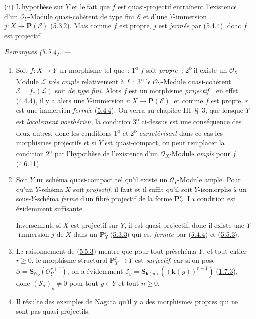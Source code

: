 (ii) L'hypothèse sur $Y$ et le fait que $f$ est quasi-projectif entraînent
l'existence d'un $\mathcal{O}_Y$-Module quasi-cohérent de type fini
$\mathcal{E}$ et d'une $Y$-immersion $j:X\to\mathbf{P}(\mathcal{E})$
(\hyperref[II.5.3.2-fr]{5.3.2}). Mais comme $f$ est propre, $j$ est \emph{fermée} par
(\hyperref[II.5.4.4-fr]{5.4.4}), donc $f$ est projectif.

\par\medskip\noindent\textit{Remarques (5.5.4). ---\ }
\label{II.5.5.4-fr}
\begin{enumerate}
  \item[\rm{(i)}] Soit $f:X\to Y$ un morphisme tel que~:
  1\textsuperscript{o} $f$ soit \emph{propre}~; 2\textsuperscript{o} il existe un
  $\mathcal{O}_X$-Module $\mathcal{L}$ \emph{très ample} relativement à $f$~;
  3\textsuperscript{o} le $\mathcal{O}_Y$-Module quasi-cohérent
  $\mathcal{E}=f_*(\mathcal{L})$ soit \emph{de type fini}. Alors $f$ est un morphisme
  \emph{projectif}~: en effet (\hyperref[II.4.4.4-fr]{4.4.4}), il y a alors une
  $Y$-immersion $r:X\to\mathbf{P}(\mathcal{E})$, et comme $f$ est propre, $r$
  est une immersion \emph{fermée} (\hyperref[II.5.4.4-fr]{5.4.4}). On verra au
  chapitre III, \S~3, que lorsque $Y$ est \emph{localement noethérien}, la condition
  3\textsuperscript{o} ci-dessus est une conséquence des deux autres, donc les
  conditions 1\textsuperscript{o} et 2\textsuperscript{o} \emph{caractérisent} dans
  ce cas les morphismes projectifs et si $Y$ est quasi-compact, on peut
  remplacer la condition 2\textsuperscript{o} par l'hypothèse de l'existence
  d'un $\mathcal{O}_X$-Module \emph{ample} pour $f$
  (\hyperref[II.4.6.11-fr]{4.6.11}).
  \item[\rm{(ii)}] Soit $Y$ un schéma quasi-compact tel qu'il existe un
  $\mathcal{O}_Y$-Module ample. Pour qu'un $Y$-schéma $X$ soit \emph{projectif}, il
  faut et il suffit qu'il soit $Y$-isomorphe à un sous-$Y$-schéma \emph{fermé} d'un
  fibré projectif de la forme $\mathbf{P}_Y^r$. La condition est évidemment
  suffisante.


  Inversement, si $X$ est projectif sur $Y$, il est quasi-projectif, donc il
  existe une $Y$-immersion $j$ de $X$ dans un $\mathbf{P}_Y^r$
  (\hyperref[II.5.3.3-fr]{5.3.3}) qui est \emph{fermée} par
  (\hyperref[II.5.4.4-fr]{5.4.4}) et
  (\hyperref[II.5.5.3-fr]{5.5.3}).
  \item[\rm{(iii)}] Le raisonnement de
  (\hyperref[II.5.5.3-fr]{5.5.3}) montre que pour tout préschéma $Y$, et tout
  entier $r\geq0$, le morphisme structural $\mathbf{P}_Y^r\to Y$ est
  \emph{surjectif}, car si on pose
  $\mathcal{S}=\mathbf{S}_{\mathcal{O}_Y}(\mathcal{O}_Y^{r+1})$, on a
  évidemment $\mathcal{S}_y=\mathbf{S}_{\boldsymbol{k}(y)}((\boldsymbol{k}(y))^{r+1})$
  (\hyperref[II.1.7.3-fr]{1.7.3}), donc $(\mathcal{S}_n)_y\neq0$ pour tout
  $y\in Y$ et tout $n\geq0$.
  \item[\rm{(iv)}] Il résulte des exemples de Nagata \cite{II-26} qu'il y a
  des morphismes propres qui ne sont pas quasi-projectifs.
\end{enumerate}

